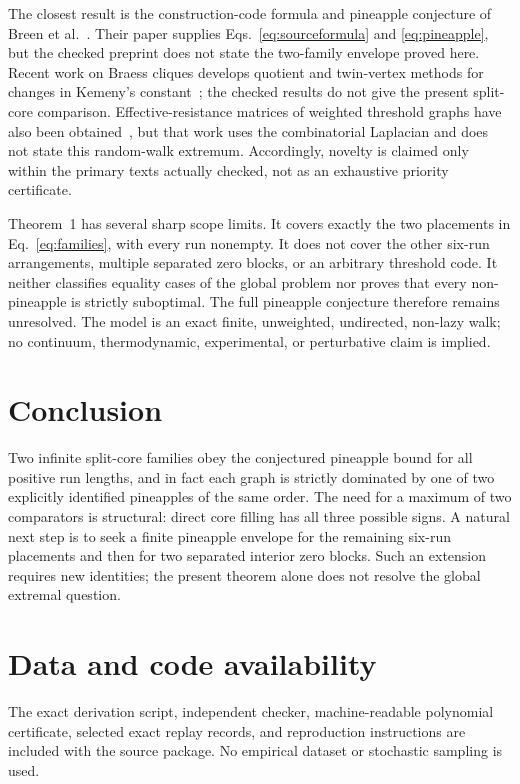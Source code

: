 \documentclass[11pt]{article}
\begin{document}
The closest result is the construction-code formula and pineapple conjecture of
Breen et al.~\cite{BreenEtAl2025}.  Their paper supplies
Eqs.~\eqref{eq:sourceformula} and \eqref{eq:pineapple}, but the checked preprint
does not state the two-family envelope proved here.  Recent work on Braess
cliques develops quotient and twin-vertex methods for changes in Kemeny's
constant~\cite{BreenDeBlieckVanderMeulen2026}; the checked results do not give
the present split-core comparison.  Effective-resistance matrices of weighted
threshold graphs have also been obtained~\cite{KeVanMieghem2026}, but that work
uses the combinatorial Laplacian and does not state this random-walk extremum.
Accordingly, novelty is claimed only within the primary texts actually checked,
not as an exhaustive priority certificate.

Theorem~1 has several sharp scope limits.  It covers exactly the two placements
in Eq.~\eqref{eq:families}, with every run nonempty.  It does not cover the other
six-run arrangements, multiple separated zero blocks, or an arbitrary threshold
code.  It neither classifies equality cases of the global problem nor proves
that every non-pineapple is strictly suboptimal.  The full pineapple conjecture
therefore remains unresolved.  The model is an exact finite, unweighted,
undirected, non-lazy walk; no continuum, thermodynamic, experimental, or
perturbative claim is implied.

\section{Conclusion}

Two infinite split-core families obey the conjectured pineapple bound for all
positive run lengths, and in fact each graph is strictly dominated by one of
two explicitly identified pineapples of the same order.  The need for a maximum
of two comparators is structural: direct core filling has all three possible
signs.  A natural next step is to seek a finite pineapple envelope for the
remaining six-run placements and then for two separated interior zero blocks.
Such an extension requires new identities; the present theorem alone does not
resolve the global extremal question.

\section*{Data and code availability}

The exact derivation script, independent checker, machine-readable polynomial
certificate, selected exact replay records, and reproduction instructions are
included with the source package.  No empirical dataset or stochastic sampling
is used.
\end{document}
